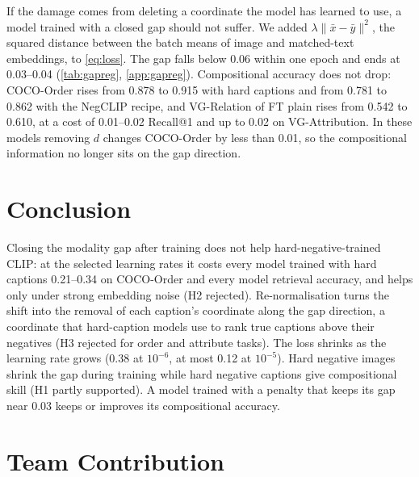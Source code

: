 \documentclass{article}
\begin{document}
If the damage comes from deleting a coordinate the model has learned to use, a model trained with a closed gap should not suffer. We added $\lambda\lVert\bar x-\bar y\rVert^2$, the squared distance between the batch means of image and matched-text embeddings, to \cref{eq:loss}. The gap falls below 0.06 within one epoch and ends at 0.03--0.04 (\cref{tab:gapreg}, \cref{app:gapreg}). Compositional accuracy does not drop: COCO-Order rises from 0.878 to 0.915 with hard captions and from 0.781 to 0.862 with the NegCLIP recipe, and VG-Relation of FT plain rises from 0.542 to 0.610, at a cost of 0.01--0.02 Recall@1 and up to 0.02 on VG-Attribution. In these models removing $d$ changes COCO-Order by less than 0.01, so the compositional information no longer sits on the gap direction.

\section{Conclusion}
\label{sec:conclusion}

Closing the modality gap after training does not help hard-negative-trained CLIP: at the selected learning rates it costs every model trained with hard captions 0.21--0.34 on COCO-Order and every model retrieval accuracy, and helps only under strong embedding noise (H2 rejected). Re-normalisation turns the shift into the removal of each caption's coordinate along the gap direction, a coordinate that hard-caption models use to rank true captions above their negatives (H3 rejected for order and attribute tasks). The loss shrinks as the learning rate grows (0.38 at $10^{-6}$, at most 0.12 at $10^{-5}$). Hard negative images shrink the gap during training while hard negative captions give compositional skill (H1 partly supported). A model trained with a penalty that keeps its gap near 0.03 keeps or improves its compositional accuracy.




\newpage %
\section*{Team Contribution}
\end{document}
